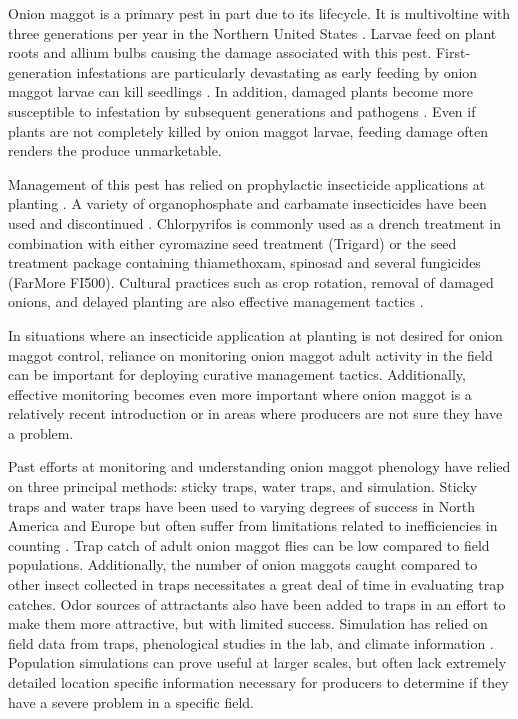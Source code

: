 \documentclass[alpha-refs]{wiley-article}
\begin{document}
Onion maggot is a primary pest in part due to its lifecycle.  It is multivoltine with three generations per year in the Northern United States \citep{eckenrode1975population, hoepting2004insecticide}.  Larvae feed on plant roots and allium bulbs causing the damage associated with this pest.  First-generation infestations are particularly devastating as early feeding by onion maggot larvae can kill seedlings \citep{nault2006onion, nault2006performance}.  In addition, damaged plants become more susceptible to infestation by subsequent generations and pathogens \citep{eckenrode1986impact,nault2006performance}.  Even if plants are not completely killed by onion maggot larvae, feeding damage often renders the produce unmarketable.  

Management of this pest has relied on prophylactic insecticide applications at planting \citep{nault2006performance}.  A variety of organophosphate and carbamate insecticides have been used and discontinued \citep{nault2006performance}.  Chlorpyrifos is commonly used as a drench treatment in combination with either cyromazine seed treatment (Trigard)  \citep{nault2006performance} or the seed treatment package containing thiamethoxam, spinosad and several fungicides (FarMore FI500).  Cultural practices such as crop rotation, removal of damaged onions, and delayed planting are also effective management tactics \citep{martinson1988dispersal, finch1985influence, nault2011delaying}.  

In situations where an insecticide application at planting is not desired for onion maggot control, reliance on monitoring onion maggot adult activity in the field can be important for deploying curative management tactics. Additionally, effective monitoring becomes even more important where onion maggot is a relatively recent introduction or in areas where producers are not sure they have a problem. 

Past efforts at monitoring and understanding onion maggot phenology have relied on three principal methods: sticky traps, water traps, and simulation.  Sticky traps and water traps have been used to varying degrees of success in North America and Europe but often suffer from limitations related to inefficiencies in counting \citep{thomingdeveloping,otto2000development}.  Trap catch of adult onion maggot flies can be low compared to field populations.  Additionally, the number of onion maggots caught compared to other insect collected in traps necessitates a great deal of time in evaluating trap catches.  Odor sources of attractants also have been added to traps in an effort to make them more attractive, but with limited success.  Simulation has relied on field data from traps, phenological studies in the lab, and climate information \citep{thomingdeveloping,otto2000development,ning2017predicting}.  Population simulations can prove useful at larger scales, but often lack extremely detailed location specific information necessary for producers to determine if they have a severe problem in a specific field.  
\end{document}
